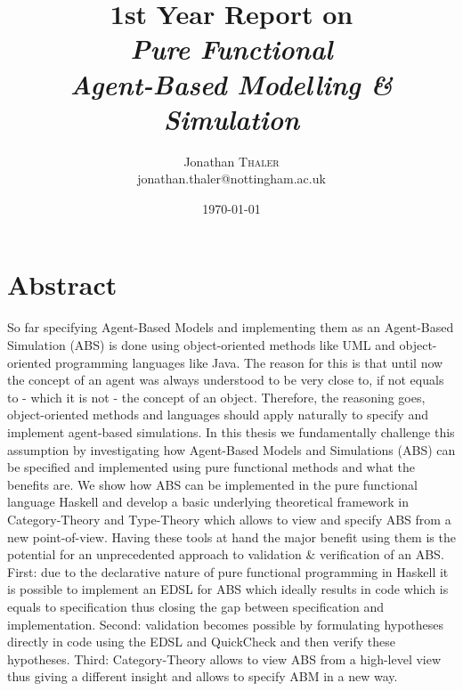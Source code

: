 \documentclass[oneside]{book}
\title{1st Year Report on \\ \textit{Pure Functional \\ Agent-Based Modelling \& Simulation}} %
\author{Jonathan \textsc{Thaler} \\ jonathan.thaler@nottingham.ac.uk} %
\date{\today} %
\begin{document}
\maketitle %


\cleardoublepage
\section*{Abstract}

So far specifying Agent-Based Models and implementing them as an Agent-Based Simulation (ABS) is done using object-oriented methods like UML and object-oriented  programming languages like Java. The reason for this is that until now the concept of an agent was always understood to be very close to, if not equals to - which it is not - the concept of an object. Therefore, the reasoning goes, object-oriented methods and languages should apply naturally to specify and implement agent-based simulations. In this thesis we fundamentally challenge this assumption by investigating how Agent-Based Models and Simulations (ABS) can be specified and implemented using pure functional methods and what the benefits are. 
We show how ABS can be implemented in the pure functional language Haskell and develop a basic underlying theoretical framework in Category-Theory and Type-Theory which allows to view and specify ABS from a new point-of-view. Having these tools at hand the major benefit using them is the potential for an unprecedented approach to validation \& verification of an ABS. First: due to the declarative nature of pure functional programming in Haskell it is possible to implement an EDSL for ABS which ideally results in code which is equals to specification thus closing the gap between specification and implementation. Second: validation becomes possible by formulating hypotheses directly in code using the EDSL and QuickCheck and then verify these hypotheses. Third: Category-Theory allows to view ABS from a high-level view thus giving a different insight and allows to specify ABM in a new way.

\clearpage
\tableofcontents
\clearpage



















\end{document}
